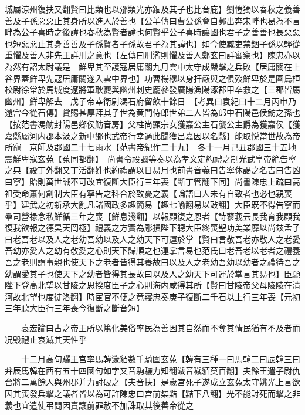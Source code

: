 城屬涼州復扶又翻賢曰比類也以邠類光亦錮及其子也比音庇】劉愷獨以春秋之義善善及子孫惡惡止其身所以進人於善也【公羊傳曰曹公孫會自鄸出奔宋畔也曷為不言畔為公子喜時之後諱也春秋為賢者諱也何賢乎公子喜時讓國也君子之善善也長惡惡也短惡惡止其身善善及子孫賢者子孫故君子為其諱也】如今使臧吏禁錮子孫以輕從重懼及善人非先王詳刑之意也【左傳曰刑濫則懼及善人鄭玄曰詳審察也】陳忠亦以為然有詔太尉議是　鮮卑其至護寇居庸關九月雲中太守成嚴擊之兵敗【居庸關在上谷界蓋鮮卑先寇居庸關遂入雲中界也】功曹楊穆以身扞嚴與之俱歿鮮卑於是圍烏桓校尉徐常於馬城度遼將軍耿夔與幽州刺史龐參發廣陽漁陽涿郡甲卒救之【三郡皆屬幽州】鮮卑解去　戊子帝幸衛尉馮石府留飲十餘日　【考異曰袁紀曰十二月丙申乃還宫今從石傳】賞賜甚厚拜其子世為黄門侍郎世弟二人皆為郎中石陽邑侯魴之孫也【按范書馮魴封陽邑鄉侯魴音房】父柱尚顯宗女獲嘉公主石襲公主爵為獲嘉侯【獲嘉縣屬河内郡本汲之新中鄉也武帝行幸過此聞獲呂嘉因以名縣】能取悦當世故為帝所寵　京師及郡國二十七雨水【范書帝紀作二十九】　冬十一月己丑郡國三十五地震鮮卑寇玄菟【菟同都翻】　尚書令祋諷等奏以為孝文定約禮之制光武皇帝絶告寧之典【祋丁外翻又丁活翻姓也約禮謂以日易月也前書音義曰告寧休謁之名吉曰告凶曰寧】貽則萬世誠不可改宜復斷大臣行三年喪【斷丁管翻下同】尚書陳忠上疏曰高祖受命蕭何創制大臣有寧告之科合於致憂之義【論語曰人未有自致者也必也親喪乎】建武之初新承大亂凡諸國政多趣簡易【趣七喻翻易以䜴翻】大臣既不得告寧而羣司營禄念私鮮循三年之喪【鮮息淺翻】以報顧復之恩者【詩蓼莪云長我育我顧我復我欲報之德昊天罔極】禮義之方實為彫損陛下聼大臣終喪聖功美業靡以尚兹孟子曰老吾老以及人之老幼吾幼以及人之幼天下可運於掌【賢曰言敬吾老亦敬人之老愛吾幼亦愛人之幼有敬愛之心則天下歸順之也運掌言易也范氏曰老吾老以老者之禮養吾之老則謂事親也使天下之老者皆得其養故曰以及人之老幼吾幼以幼者之禮待吾之幼謂愛其子也使天下之幼者皆得其長故曰以及人之幼天下可運於掌言其易也】臣願陛下登高北望以甘陵之思揆度臣子之心則海内咸得其所【賢曰甘陵帝父母陵陵在清河故北望也度徒洛翻】時宦官不便之竟寢忠奏庚子復斷二千石以上行三年喪【元初三年聼大臣行三年喪今復斷之斷音短】

　　袁宏論曰古之帝王所以篤化美俗率民為善因其自然而不奪其情民猶有不及者而况毁禮止哀滅其天性乎

　　十二月高句驪王宫率馬韓濊貊數千騎圍玄菟【韓有三種一曰馬韓二曰辰韓三曰弁辰馬韓在西有五十四國句如字又音駒驪力知翻濊音穢貊莫百翻】夫餘王遣子尉仇台將二萬餘人與州郡并力討破之【夫音扶】是歲宫死子遂成立玄菟太守姚光上言欲因其喪發兵擊之議者皆以為可許陳忠曰宫前桀黠【黠下八翻】光不能討死而擊之非義也宜遣使弔問因責讓前罪赦不加誅取其後善帝從之

